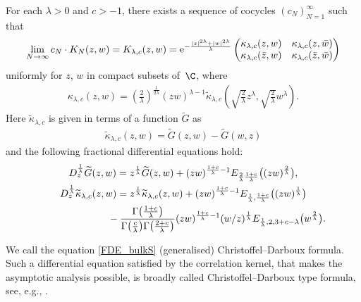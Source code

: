 \begin{Proposition} \label{Thm_bulkS}
	For each $\lambda>0$ and $c>-1$, there exists a sequence of cocycles $(c_N)_{N=1}^\infty$ such that
	\begin{gather*}
			\lim_{N \to \infty} c_N\cdot K_N(z,w)=K_{\lambda,c}(z,w)
			={\rm e}^{ -\frac{ |z|^{2\lambda}+|w|^{2\lambda} }{\lambda} } \begin{pmatrix}
				\kappa_{\lambda,c}(z,w) & \kappa_{\lambda,c}(z,\bar{w}) \\
				\kappa_{\lambda,c}(\bar{z},w) & \kappa_{\lambda,c}(\bar{z},\bar{w})
			\end{pmatrix}
		\end{gather*}
	uniformly for $z$, $w$ in compact subsets of~$\C$, where
	\begin{gather*}
		\kappa_{\lambda,c}(z,w)=\left( \frac{2}{\lambda} \right)^{ \frac{1}{2\lambda} } (zw)^{\lambda-1} \widetilde{\kappa}_{\lambda,c} \left( \sqrt{ \frac{2}{\lambda} } z^\lambda, \sqrt{ \frac{2}{\lambda} } w^\lambda \right).
	\end{gather*}
	Here $\widetilde{\kappa}_{\lambda,c}$ is given in terms of a function $\widetilde{G}$ as
	\begin{gather*}
	\widetilde{\kappa}_{\lambda,c}(z,w)=\widetilde{G}(z,w)-\widetilde{G}(w,z)
	\end{gather*}
 and the following fractional differential equations hold:
	\begin{gather} \label{G zw FDE}
		D_z^{ \frac{1}{\lambda} } \widetilde{G}(z,w)= z^{ \frac{1}{\lambda} } \widetilde{G}(z,w)+(zw)^{\frac{1+c}{\lambda}-1} E_{\frac{2}{\lambda} \frac{1+c}{\lambda} } \big( (zw)^{\frac{2}{\lambda}} \big),
\\
			D_z^{ \frac{1}{\lambda} } \widetilde{\kappa}_{\lambda,c}(z,w)
			= z^{ \frac{1}{\lambda} } \widetilde{\kappa}_{\lambda,c}(z,w)+ (zw)^{ \frac{1+c}{\lambda}-1 } E_{ \frac{1}{\lambda},\frac{1+c}{\lambda} } \big( (zw)^{\frac{1}{\lambda}} \big)
			\nonumber\\
\hphantom{D_z^{ \frac{1}{\lambda} } \widetilde{\kappa}_{\lambda,c}(z,w)=}{}
 -\frac{ \Gamma\big(\frac{1+c}{\lambda}\big) }{\Gamma\big( \frac{c}{\lambda}\big) \Gamma\big( \frac{2+c}{\lambda}\big) } (zw)^{ \frac{1+c}{\lambda}-1 }(w/z)^{\frac{1}{\lambda}} E_{\frac{1}{\lambda},2,3+c-\lambda}\big(w^{\frac{2}{\lambda}}\big) .\label{FDE_bulkS}
		\end{gather}
\end{Proposition}


We call the equation \eqref{FDE_bulkS} (generalised) Christoffel--Darboux formula.
Such a differential equation satisfied by the correlation kernel, that makes the asymptotic analysis possible, is broadly called Christoffel--Darboux type formula, see, e.g., \cite{MR1917675,byun2021lemniscate,MR3450566}.

